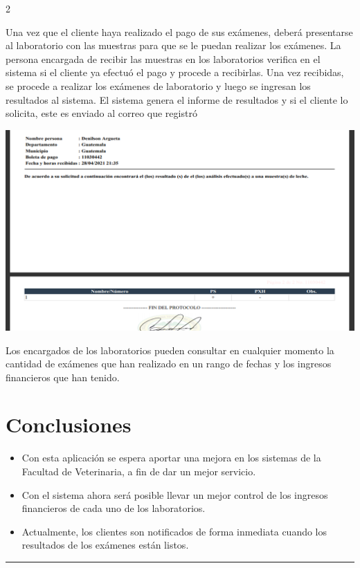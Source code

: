 \documentclass[12pt,spanish,Letterpaper,openany]{book}
\newcommand{\HRule}{\begin{center}\rule{0.5\linewidth}{0.2mm}\end{center}}
\begin{document}
\begin {multicols}{2}
\begin {flushleft}
\begin{minipage}[c]{\columnwidth}
\end{minipage}
\end {flushleft}

Una vez que el cliente haya realizado el pago de sus exámenes, deberá presentarse al laboratorio con las muestras para que se le puedan realizar los exámenes. La persona encargada de recibir las muestras en los laboratorios verifica en el sistema si el cliente ya efectuó el pago y procede a recibirlas. Una vez recibidas, se procede a realizar los exámenes de laboratorio y luego se ingresan los resultados al sistema. El sistema genera el informe de resultados y si el cliente lo solicita, este es enviado al correo que registró

\begin {flushleft}
\noindent\begin{minipage}[c]{\columnwidth}

\includegraphics[width=1\linewidth]{images/denilson_04}

\end{minipage}
\end {flushleft}

Los encargados de los laboratorios pueden consultar en cualquier momento la cantidad de exámenes que han realizado en un rango de fechas y los ingresos financieros que han tenido.

\hypertarget{conclusiones-1}{%
\section{Conclusiones}\label{conclusiones-1}}

\begin{itemize}
\item
  Con esta aplicación se espera aportar una mejora en los sistemas de la Facultad de Veterinaria, a fin de dar un mejor servicio.
\item
  Con el sistema ahora será posible llevar un mejor control de los ingresos financieros de cada uno de los laboratorios.
\item
  Actualmente, los clientes son notificados de forma inmediata cuando los resultados de los exámenes están listos.
\end{itemize}

\end {multicols}
\medskip
\HRule
\medskip
\end{document}
